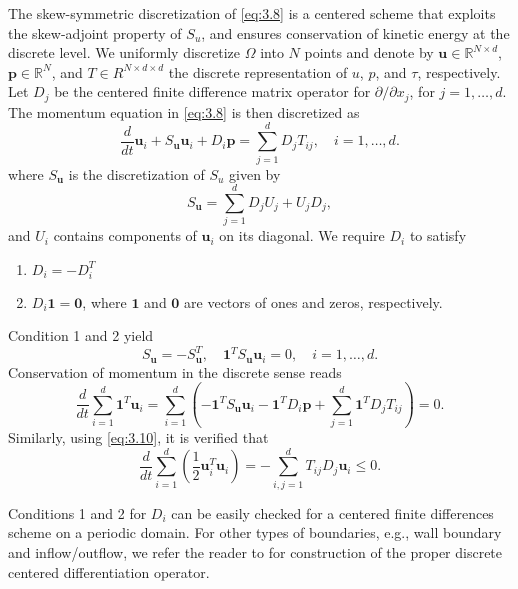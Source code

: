 The skew-symmetric discretization of \eqref{eq:3.8} is a centered scheme that exploits the skew-adjoint property of $S_u$, and ensures conservation of kinetic energy at the discrete level. We uniformly discretize $\Omega$ into $N$ points and denote by $\mathbf u \in \mathbb R^{N\times d}$, $\mathbf p \in \mathbb R^N$, and $T \in R^{N\times d\times d} $ the discrete representation of $u$, $p$, and $\tau$, respectively. Let $D_j$ be the centered finite difference matrix operator for $\partial / \partial x_j$, for $j = 1,\dots,d$. The momentum equation in \eqref{eq:3.8} is then discretized as
\begin{equation} \label{eq:3.13}
	\frac{d}{dt}{\mathbf u}_i + S_{\mathbf u} \mathbf u_i + D_i \mathbf p = \sum_{j=1}^d D_j T_{ij}, \quad i=1,\dots,d.
\end{equation}
where $S_{\mathbf u}$ is the discretization of $S_{u}$ given by
\begin{equation} \label{eq:3.14}
	S_{\mathbf u} = \sum_{j=1}^d D_j U_j + U_j D_j,
\end{equation}
and $U_i$ contains components of $\mathbf u_i$ on its diagonal. We require $D_i$ to satisfy
\begin{enumerate}
	\item $D_i = -D_i^T$
	\item $D_i \mathbf 1 = \mathbf 0$, where $\mathbf 1$ and $\mathbf 0$ are vectors of ones and zeros, respectively.
\end{enumerate}
Condition 1 and 2 yield
\begin{equation} \label{eq:3.15}
	S_{\mathbf u} = -S_{\mathbf u}^T, \quad \mathbf 1^T S_{\mathbf u} \mathbf u_i = 0, \quad i=1,\dots,d.
\end{equation}
Conservation of momentum in the discrete sense reads
\begin{equation} \label{eq:3.16}
	\frac{d}{dt} \sum_{i=1}^d  \mathbf 1^T \mathbf u_i = \sum_{i=1}^d \left( - \mathbf 1^T S_{\mathbf u} \mathbf u_i - \mathbf 1^T D_i \mathbf p + \sum_{j=1}^d \mathbf 1^T D_j T_{ij}  \right) = 0.
\end{equation}
Similarly, using \eqref{eq:3.10}, it is verified that
\begin{equation} \label{eq:3.17}
\frac{d}{dt} \sum_{i=1}^d \left( \frac 1 2 \mathbf u_i^T \mathbf u_i \right) = - \sum_{i,j=1}^d T_{ij}D_j \mathbf u_i \leq 0.
\end{equation}

Conditions 1 and 2 for $D_i$ can be easily checked for a centered finite differences scheme on a periodic domain. For other types of boundaries, e.g., wall boundary and inflow/outflow, we refer the reader to \cite{morinishi1998fully,desjardins2008high} for construction of the proper discrete centered differentiation operator. 

